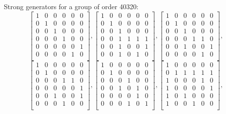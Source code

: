 Strong generators for a group of order 40320:
$$
\left[
\begin{array}{*{6}{r}}
1 & 0 & 0 & 0 & 0 & 0\\
0 & 1 & 0 & 0 & 0 & 0\\
0 & 0 & 1 & 0 & 0 & 0\\
0 & 0 & 0 & 1 & 0 & 0\\
0 & 0 & 0 & 0 & 0 & 1\\
0 & 0 & 0 & 0 & 1 & 0\\
\end{array}
\right]
, 
\left[
\begin{array}{*{6}{r}}
1 & 0 & 0 & 0 & 0 & 0\\
0 & 1 & 0 & 0 & 0 & 0\\
0 & 0 & 1 & 0 & 0 & 0\\
0 & 0 & 1 & 1 & 1 & 1\\
0 & 0 & 1 & 0 & 0 & 1\\
0 & 0 & 1 & 0 & 1 & 0\\
\end{array}
\right]
, 
\left[
\begin{array}{*{6}{r}}
1 & 0 & 0 & 0 & 0 & 0\\
0 & 1 & 0 & 0 & 0 & 0\\
0 & 0 & 1 & 0 & 0 & 0\\
0 & 0 & 0 & 1 & 1 & 0\\
0 & 0 & 1 & 0 & 0 & 1\\
0 & 0 & 0 & 0 & 1 & 0\\
\end{array}
\right]
, 
$$
$$
\left[
\begin{array}{*{6}{r}}
1 & 0 & 0 & 0 & 0 & 0\\
0 & 1 & 0 & 0 & 0 & 0\\
0 & 0 & 0 & 1 & 1 & 0\\
0 & 0 & 0 & 0 & 0 & 1\\
0 & 0 & 1 & 0 & 0 & 1\\
0 & 0 & 0 & 1 & 0 & 0\\
\end{array}
\right]
, 
\left[
\begin{array}{*{6}{r}}
1 & 0 & 0 & 0 & 0 & 0\\
0 & 1 & 0 & 0 & 0 & 0\\
0 & 0 & 0 & 1 & 0 & 0\\
0 & 0 & 1 & 0 & 1 & 0\\
0 & 0 & 0 & 0 & 1 & 0\\
0 & 0 & 0 & 1 & 0 & 1\\
\end{array}
\right]
, 
\left[
\begin{array}{*{6}{r}}
1 & 0 & 0 & 0 & 0 & 0\\
0 & 1 & 1 & 1 & 1 & 1\\
1 & 0 & 0 & 0 & 1 & 0\\
1 & 0 & 0 & 0 & 0 & 1\\
1 & 0 & 1 & 0 & 0 & 0\\
1 & 0 & 0 & 1 & 0 & 0\\
\end{array}
\right]
, 
$$
